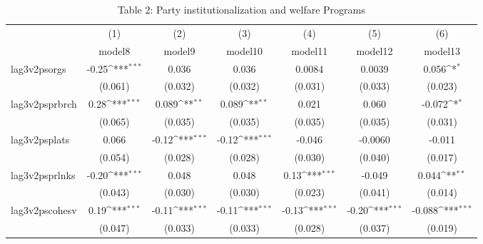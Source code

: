 \begin{table}[htbp]\centering
\def\sym#1{\ifmmode^{#1}\else\(^{#1}\)\fi}
\caption{Table 2: Party institutionalization and welfare Programs}
\begin{tabular}{l*{6}{c}}
\hline\hline
            &\multicolumn{1}{c}{(1)}         &\multicolumn{1}{c}{(2)}         &\multicolumn{1}{c}{(3)}         &\multicolumn{1}{c}{(4)}         &\multicolumn{1}{c}{(5)}         &\multicolumn{1}{c}{(6)}         \\
            &      model8         &      model9         &     model10         &     model11         &     model12         &     model13         \\
\hline
lag3v2psorgs&       -0.25\sym{***}&       0.036         &       0.036         &      0.0084         &      0.0039         &       0.056\sym{*}  \\
            &     (0.061)         &     (0.032)         &     (0.032)         &     (0.031)         &     (0.033)         &     (0.023)         \\
[1em]
lag3v2psprbrch&        0.28\sym{***}&       0.089\sym{**} &       0.089\sym{**} &       0.021         &       0.060         &      -0.072\sym{*}  \\
            &     (0.065)         &     (0.035)         &     (0.035)         &     (0.035)         &     (0.035)         &     (0.031)         \\
[1em]
lag3v2psplats&       0.066         &       -0.12\sym{***}&       -0.12\sym{***}&      -0.046         &     -0.0060         &      -0.011         \\
            &     (0.054)         &     (0.028)         &     (0.028)         &     (0.030)         &     (0.040)         &     (0.017)         \\
[1em]
lag3v2psprlnks&       -0.20\sym{***}&       0.048         &       0.048         &        0.13\sym{***}&      -0.049         &       0.044\sym{**} \\
            &     (0.043)         &     (0.030)         &     (0.030)         &     (0.023)         &     (0.041)         &     (0.014)         \\
[1em]
lag3v2pscohesv&        0.19\sym{***}&       -0.11\sym{***}&       -0.11\sym{***}&       -0.13\sym{***}&       -0.20\sym{***}&      -0.088\sym{***}\\
            &     (0.047)         &     (0.033)         &     (0.033)         &     (0.028)         &     (0.037)         &     (0.019)         \\

\end{tabular}
\end{table}
